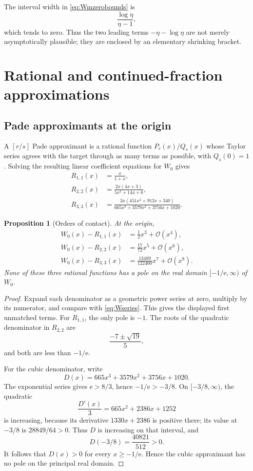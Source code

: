 \documentclass[11pt]{article}
\newtheorem{proposition}[proposition]{Proposition}
\theoremstyle{remark}
\newcommand{\Wz}{W_0}
\newcommand{\ee}{\mathrm e}
\newcommand{\bigO}{\mathcal O}
\begin{document}
The interval width in \eqref{eq:Wmzerobounds} is
\[
       \frac{\log\eta}{\eta-1},
\]
which tends to zero.  Thus the two leading terms
\(-\eta-\log\eta\) are not merely asymptotically plausible; they are enclosed
by an elementary shrinking bracket.

\section{Rational and continued-fraction approximations}\label{sec:rational}

\subsection{Pade approximants at the origin}

A \([r/s]\) Pade approximant is a rational function \(P_r(x)/Q_s(x)\)
whose Taylor series agrees with the target through as many terms as possible,
with \(Q_s(0)=1\).  Solving the resulting linear coefficient equations for
\(\Wz\) gives
\begin{align}
 R_{1,1}(x)&=\frac{x}{1+x},\label{eq:pade11}\\
 R_{2,2}(x)&=\frac{2x(4x+3)}{5x^2+14x+6},\label{eq:pade22}\\
 R_{3,3}(x)&=
 \frac{3x(451x^2+912x+340)}
 {665x^3+3579x^2+3756x+1020}.\label{eq:pade33}
\end{align}

\begin{proposition}[Orders of contact]\label{prop:pade-errors}
At the origin,
\begin{align}
 \Wz(x)-R_{1,1}(x)&=\frac12x^3+\bigO(x^4),\\
 \Wz(x)-R_{2,2}(x)&=\frac{17}{72}x^5+\bigO(x^6),\\
 \Wz(x)-R_{3,3}(x)&=\frac{13489}{122400}x^7+\bigO(x^8).
\end{align}
None of these three rational functions has a pole on the real domain
\([-1/\ee,\infty)\) of \(\Wz\).
\end{proposition}

\begin{proof}
Expand each denominator as a geometric power series at zero, multiply by its
numerator, and compare with \eqref{eq:Wseries}.  This gives the displayed
first unmatched terms.  For \(R_{1,1}\), the only pole is \(-1\).  The roots
of the quadratic denominator in \(R_{2,2}\) are
\[
       \frac{-7\pm\sqrt{19}}5,
\]
and both are less than \(-1/\ee\).

For the cubic denominator, write
\[
       D(x)=665x^3+3579x^2+3756x+1020.
\]
The exponential series gives \(\ee>8/3\), hence
\(-1/\ee>-3/8\).  On \([-3/8,\infty)\), the quadratic
\[
       \frac{D'(x)}3=665x^2+2386x+1252
\]
is increasing, because its derivative \(1330x+2386\) is positive there;
its value at \(-3/8\) is \(28849/64>0\).  Thus \(D\) is increasing on
that interval, and
\[
       D(-3/8)=\frac{40821}{512}>0.
\]
It follows that \(D(x)>0\) for every \(x\geq-1/\ee\).  Hence the cubic
approximant has no pole on the principal real domain.
\end{proof}
\end{document}
